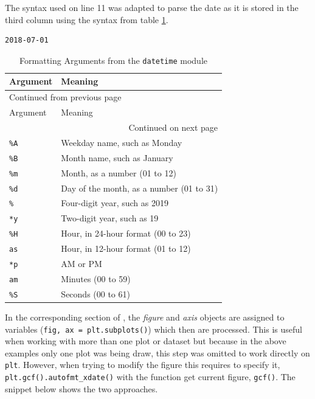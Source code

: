 \documentclass[10pt]{book}
\begin{document}
The syntax used on line 11 was adapted to parse the date as it is stored in the third column using the syntax from table \ref{tab:orge035c10}.

\label{orgd9cae86}
\label{orga11337f}
\begin{verbatim}
2018-07-01
\end{verbatim}

\begin{longtable}{ll}
\caption{\label{tab:orge035c10}Formatting Arguments from the \texttt{datetime} module}
\\
Argument & Meaning\\
\hline
\endfirsthead
\multicolumn{2}{l}{Continued from previous page} \\
\hline

Argument & Meaning \\

\hline
\endhead
\hline\multicolumn{2}{r}{Continued on next page} \\
\endfoot
\endlastfoot
\hline
\texttt{\%A} & Weekday name, such as Monday\\
\texttt{\%B} & Month name, such as January\\
\texttt{\%m} & Month, as a number (01 to 12)\\
\texttt{\%d} & Day of the month, as a number (01 to 31)\\
\texttt{\%} & Four-digit year, such as 2019\\
\texttt{*y} & Two-digit year, such as 19\\
\texttt{\%H} & Hour, in 24-hour format (00 to 23)\\
\texttt{as} & Hour, in 12-hour format (01 to 12)\\
\texttt{*p} & AM or PM\\
\texttt{am} & Minutes (00 to 59)\\
\texttt{\%S} & Seconds (00 to 61)\\
\end{longtable}

In the corresponding section of \textcite{Matthes-2019}, the \emph{figure} and \emph{axis} objects are assigned to variables (\texttt{fig, ax = plt.subplots()}) which then are processed. This is useful when working with more than one plot or dataset but because in the above examples only one plot was being draw, this step was omitted to work directly on \texttt{plt}. However, when trying to modify the figure this requires to specify it, \texttt{plt.gcf().autofmt_xdate()} with the function get current figure, \texttt{gcf()}. The snippet below shows the two approaches.
\end{document}
